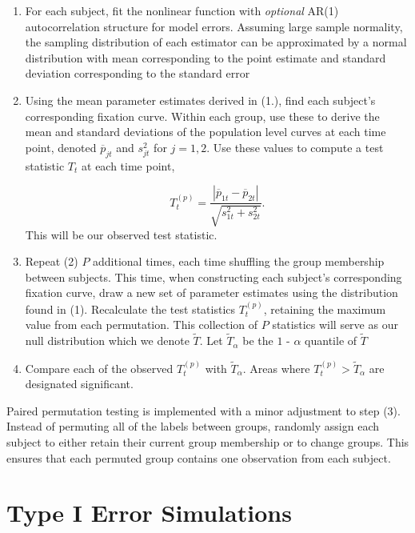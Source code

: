 \begin{enumerate}
\vspace{-2mm}
\item For each subject, fit the nonlinear function with \textit{optional} AR(1) autocorrelation structure for model errors. Assuming large sample normality, the sampling distribution of each estimator can be approximated by a normal distribution with mean corresponding to the point estimate and standard deviation corresponding to the standard error
\item Using the mean parameter estimates derived in (1.), find each subject's corresponding fixation curve. Within each group, use these to derive the mean and standard deviations of the population level curves at each time point, denoted $\overline{p}_{jt}$ and $s_{jt}^2$ for $j = 1,2$. Use these values to compute a test statistic $T_t$ at each time point,

\begin{equation}
T_t^{(p)} = \frac{|\overline{p}_{1t} - \overline{p}_{2t}|}{\sqrt{s_{1t}^2 + s_{2t}^2}}.
\end{equation}
This will be our observed test statistic.
\item Repeat (2) $P$  additional times, each time shuffling the group membership between subjects. This time, when constructing each subject's corresponding fixation curve, draw a new set of parameter estimates using the distribution found in (1). Recalculate the test statistics $T_t^{(p)}$, retaining the maximum value from each permutation. This collection of $P$ statistics will serve as our null distribution which we denote $\widetilde{T}$. Let $\widetilde{T}_{\alpha}$ be the $1$ - $\alpha$ quantile of $\widetilde{T}$
\item Compare each of the observed $T_t^{(p)}$ with $\widetilde{T}_{\alpha}$. Areas where $T_t^{(p)} > \widetilde{T}_{\alpha}$ are designated significant. 
\end{enumerate}

Paired permutation testing is implemented with a minor adjustment to step (3). Instead of permuting all of the labels between groups, randomly assign each subject to either retain their current group membership or to change groups. This ensures that each permuted group contains one observation from each subject.



\section{Type I Error Simulations}


